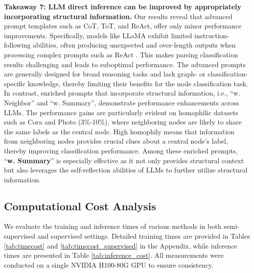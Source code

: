 \textbf{Takeaway 7: LLM direct inference can be improved by appropriately incorporating structural information.} Our results reveal that advanced prompt templates such as CoT, ToT, and ReAct, offer only minor performance improvements. Specifically, models like LLaMA exhibit limited instruction-following abilities, often producing unexpected and over-length outputs when processing complex prompts such as ReAct \cite{wu2025webwalker}. This makes parsing classification results challenging and leads to suboptimal performance. The advanced prompts are generally designed for broad reasoning tasks and lack graph- or classification-specific knowledge, thereby limiting their benefits for the node classification task. In contrast, enriched prompts that incorporate structural information, i.e., ``w. Neighbor'' and ``w. Summary'', demonstrate performance enhancements across LLMs. The performance gains are particularly evident on homophilic datasets such as Cora and Photo (3\%-10\%), where neighboring nodes are likely to share the same labels as the central node. High homophily means that information from neighboring nodes provides crucial clues about a central node's label, thereby improving classification performance. Among these enriched prompts, ``\textbf{w. Summary}'' is especially effective as it not only provides structural context but also leverages the self-reflection abilities of LLMs to further utilize structural information. 




\subsection{Computational Cost Analysis}
 
We evaluate the training and inference times of various methods in both semi-supervised and supervised settings. Detailed training times are provided in Tables \ref{tab:timecost} and \ref{tab:timecost_supervised} in the Appendix, while inference times are presented in Table \ref{tab:inference_cost}. All measurements were conducted on a single NVIDIA H100-80G GPU to ensure consistency.

